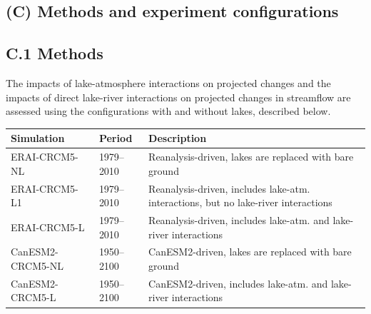 \documentclass[a0,landscape]{a0poster}
\begin{document}
\begin{multicols}{3}

\section*{(C) Methods and experiment configurations}
\subsection*{C.1 Methods}
%
The impacts of lake-atmosphere interactions on
projected changes and the impacts of direct lake-river interactions on projected
changes in streamflow are assessed using the configurations with and without
lakes, described below.\\[0.5cm]

\begin{minipage}[t]{\linewidth}
\small
\begin{tabular}{lll}
\toprule
\textbf{Simulation} & \textbf{Period} & \textbf{Description}\\
\midrule
ERAI-CRCM5-NL     & 1979--2010 & Reanalysis-driven, lakes are replaced with bare ground \\
ERAI-CRCM5-L1     & 1979--2010 & Reanalysis-driven, includes lake-atm. interactions, but no lake-river interactions\\
ERAI-CRCM5-L      & 1979--2010 & Reanalysis-driven, includes lake-atm. and lake-river interactions\\
CanESM2-CRCM5-NL & 1950--2100 & CanESM2-driven, lakes are replaced with bare ground \\
CanESM2-CRCM5-L  & 1950--2100 & CanESM2-driven, includes lake-atm. and lake-river interactions \\
\bottomrule
\end{tabular}
\end{minipage}


\end{multicols}
\end{document}
